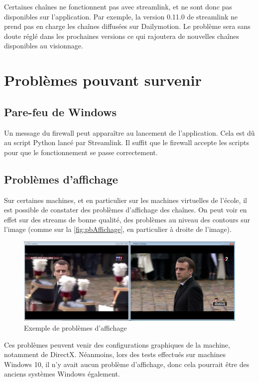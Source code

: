 \documentclass{polytech/polytech}
\begin{document}
Certaines chaînes ne fonctionnent pas avec streamlink, et ne sont donc pas disponibles sur l'application. Par exemple, la version 0.11.0 de streamlink ne prend pas en charge les chaînes diffusées sur Dailymotion. Le problème sera sans doute réglé dans les prochaines versions ce qui rajoutera de nouvelles chaînes disponibles au visionnage. 


\section{Problèmes pouvant survenir}



\subsection{Pare-feu de Windows}

Un message du firewall peut apparaître au lancement de l'application. Cela est dû au script Python lancé par Streamlink. Il suffit que le firewall accepte les scripts pour que le fonctionnement se passe correctement. 


\subsection{Problèmes d'affichage}

Sur certaines machines, et en particulier sur les machines virtuelles de l'école, il est possible de constater des problèmes d'affichage des chaînes. On peut voir en effet sur des streams de bonne qualité, des problèmes au niveau des contours sur l'image (comme sur la \autoref{fig:pbAffichage}, en particulier à droite de l'image).


\begin{figure}
	\includegraphics[scale=0.75]{images/imageQualite.png}
	\caption{Exemple de problèmes d'affichage}
	\label{fig:pbAffichage}
\end{figure}


Ces problèmes peuvent venir des configurations graphiques de la machine, notamment de DirectX. Néanmoins, lors des tests effectués sur machines Windows 10, il n'y avait aucun problème d'affichage, donc cela pourrait être des anciens systèmes Windows également.
\end{document}
